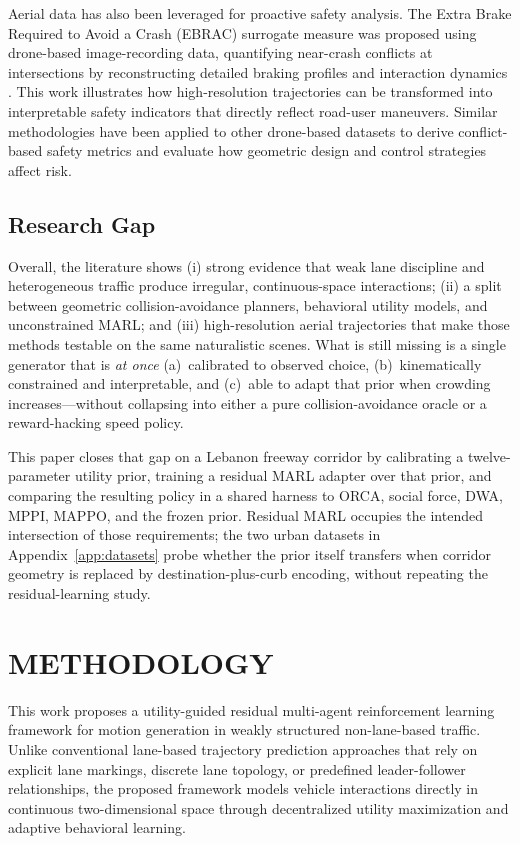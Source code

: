 \documentclass[conference]{IEEEtran}
\begin{document}
Aerial data has also been leveraged for proactive safety analysis. The Extra Brake Required to Avoid a Crash (EBRAC) surrogate measure was proposed using drone-based image-recording data, quantifying near-crash conflicts at intersections by reconstructing detailed braking profiles and interaction dynamics \cite{huang2024ebrac}. This work illustrates how high-resolution trajectories can be transformed into interpretable safety indicators that directly reflect road-user maneuvers. Similar methodologies have been applied to other drone-based datasets to derive conflict-based safety metrics and evaluate how geometric design and control strategies affect risk.

\subsection{Research Gap}
Overall, the literature shows (i) strong evidence that weak lane discipline and heterogeneous traffic produce irregular, continuous-space interactions; (ii) a split between geometric collision-avoidance planners, behavioral utility models, and unconstrained MARL; and (iii) high-resolution aerial trajectories that make those methods testable on the same naturalistic scenes. What is still missing is a single generator that is \emph{at once} (a)~calibrated to observed choice, (b)~kinematically constrained and interpretable, and (c)~able to adapt that prior when crowding increases---without collapsing into either a pure collision-avoidance oracle or a reward-hacking speed policy.

This paper closes that gap on a Lebanon freeway corridor by calibrating a twelve-parameter utility prior, training a residual MARL adapter over that prior, and comparing the resulting policy in a shared harness to ORCA, social force, DWA, MPPI, MAPPO, and the frozen prior. Residual MARL occupies the intended intersection of those requirements; the two urban datasets in Appendix~\ref{app:datasets} probe whether the prior itself transfers when corridor geometry is replaced by destination-plus-curb encoding, without repeating the residual-learning study.

\section{METHODOLOGY}
This work proposes a utility-guided residual multi-agent reinforcement learning framework for motion generation in weakly structured non-lane-based traffic. Unlike conventional lane-based trajectory prediction approaches that rely on explicit lane markings, discrete lane topology, or predefined leader-follower relationships, the proposed framework models vehicle interactions directly in continuous two-dimensional space through decentralized utility maximization and adaptive behavioral learning.
\end{document}
